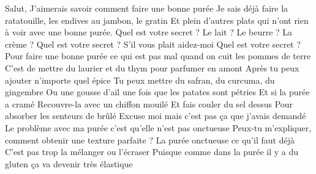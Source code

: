 \documentclass[10pt,a4paper]{article}
\begin{document}
\newline
\begin{center}
Salut, \newline
J'aimerais savoir comment faire une bonne purée \newline
Je sais déjà faire la ratatouille, les endives au jambon, le gratin \newline
Et plein d'autres plats qui n'ont rien à voir avec une bonne purée. \newline
Quel est votre secret ? \newline
Le lait ? \newline
Le beurre ? \newline
La crème ? \newline \newline
Quel est votre secret ? \newline \newline
S'il vous plait aidez-moi \newline \newline
Quel est votre secret ? \newline
Pour faire une bonne purée ce qui est pas mal quand on cuit les pommes de terre \newline
C'est de mettre du laurier et du thym pour parfumer en amont \newline
Après tu peux ajouter n'importe quel épice \newline
Tu peux mettre du safran, du curcuma, du gingembre \newline
Ou une gousse d'ail une fois que les patates sont pétries \newline
Et si la purée a cramé \newline
Recouvre-la avec un chiffon mouilé \newline
Et fais couler du sel dessus \newline
Pour absorber les senteurs de brûlé \newline
\newline
Excuse moi mais c'est pas ça que j'avais demandé \newline
Le problème avec ma purée c'est qu'elle n'est pas onctueuse \newline
Peux-tu m'expliquer, comment obtenir une texture parfaite ? \newline
La purée onctueuse ce qu'il faut déjà \newline
C'est pas trop la mélanger ou l'écraser \newline
Puisque comme dans la purée il y a du gluten ça va devenir très élastique \newline

\end{center}
\end{document}
